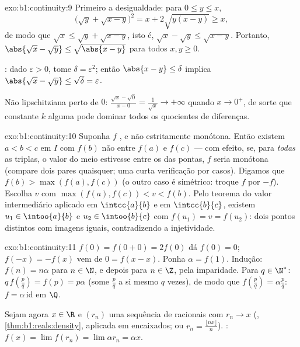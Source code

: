 \begin{solution}{exo:b1:continuity:9}
Primeiro a desigualdade: para $0 \leq y \leq x$,
\[
\bigl(\sqrt y + \sqrt{x - y}\bigr)^2 = x + 2\sqrt{y(x-y)} \geq x,
\]
de modo que $\sqrt x \leq \sqrt y + \sqrt{x - y}$, isto é, $\sqrt x - \sqrt y
\leq \sqrt{x - y}$. Portanto, $\abs{\sqrt x - \sqrt y} \leq
\sqrt{\abs{x - y}}$ para todos $x, y \geq 0$.

: dado $\varepsilon > 0$, tome $\delta =
\varepsilon^2$; então $\abs{x - y} \leq \delta$ implica $\abs{\sqrt x
- \sqrt y} \leq \sqrt\delta = \varepsilon$.

Não lipschitziana perto de $0$: $\frac{\sqrt x - \sqrt 0}{x - 0} =
\frac{1}{\sqrt x} \to +\infty$ quando $x \to 0^+$, de sorte que constante $k$ alguma
pode dominar todos os quocientes de diferenças.
\end{solution}

\begin{solution}{exo:b1:continuity:10}
Suponha $f$ ,  e não estritamente monótona.
Então existem $a < b < c$ em $I$ com $f(b)$ não entre $f(a)$ e
$f(c)$ --- com efeito, se, para \emph{todas} as triplas, o valor do
meio estivesse entre os das pontas, $f$ seria monótona (compare dois
pares quaisquer; uma curta verificação por casos). Digamos que $f(b) > \max(f(a), f(c))$ (o outro caso é simétrico: troque $f$ por $-f$). Escolha $v$ com
$\max(f(a),
f(c)) < v < f(b)$. Pelo teorema do valor intermediário aplicado em
$\intcc{a}{b}$ e em $\intcc{b}{c}$, existem $u_1 \in
\intoo{a}{b}$ e $u_2 \in \intoo{b}{c}$ com $f(u_1) = v = f(u_2)$:
dois pontos distintos com imagens iguais, contradizendo a injetividade.
\end{solution}

\begin{solution}{exo:b1:continuity:11}
$f(0) = f(0+0) = 2f(0)$ dá $f(0) = 0$; $f(-x) = -f(x)$ vem de $0 =
f(x - x)$. Ponha $\alpha = f(1)$. Indução: $f(n) = n\alpha$ para $n
\in \N$, e depois para $n \in \Z$, pela imparidade. Para $q \in \N^*$:
$q\,f(\frac pq) = f(p) = p\alpha$ (some $\frac pq$ a si mesmo $q$
vezes), de modo que $f(\frac pq) = \alpha\frac pq$: $f = \alpha\,
\mathrm{id}$ em $\Q$.

Sejam agora $x \in \R$ e $(r_n)$ uma sequência de racionais com $r_n \to
x$ (, \cref{thm:b1:reals:density}, aplicada em
 encaixados; ou $r_n = \frac{\lfloor nx\rfloor}{n}$). :
$f(x) = \lim f(r_n) = \lim \alpha r_n = \alpha x$.
\end{solution}

